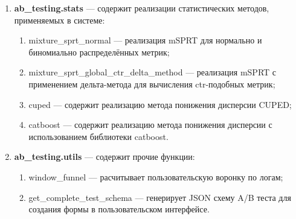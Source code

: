 \documentclass[../document.tex]{subfiles}
\begin{document}
\begin{enumerate}
		\item \textbf{ab\_testing.stats} --- содержит реализации статистических методов, применяемых в системе:
		\begin{enumerate}
			\item mixture\_sprt\_normal --- реализация mSPRT для нормально и биномиально распределённых метрик;
			\item mixture\_sprt\_global\_ctr\_delta\_method --- реализация mSPRT с применением дельта-метода для вычисления \gls{ctr}-подобных метрик;
			\item cuped --- содержит реализацию метода понижения дисперсии CUPED;
			\item catboost --- содержит реализацию метода понижения дисперсии с использованием библиотеки catboost.
		\end{enumerate}
		\item \textbf{ab\_testing.utils} --- содержит прочие функции:
		\begin{enumerate}
			\item window\_funnel --- расчитывает пользовательскую воронку по логам;
			\item get\_complete\_test\_schema --- генерирует JSON схему A/B теста для создания формы в пользовательском интерфейсе.
		\end{enumerate}
	\end{enumerate}
\end{document}
